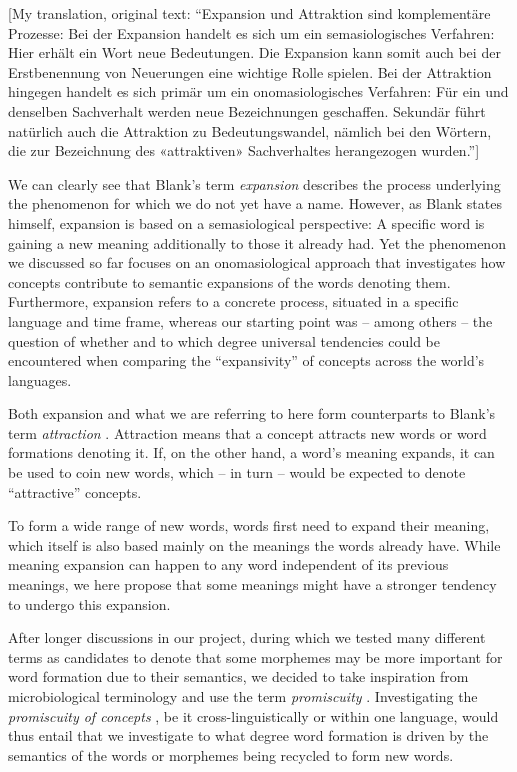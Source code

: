 \documentclass[
  english,
  a4paper,
  oneside,tablecaptionabove
]{scrbook}
\begin{document}
{{[}My translation, original text: \enquote{Expansion und Attraktion
sind komplementäre Prozesse: Bei der Expansion handelt es sich um ein
semasiologisches Verfahren: Hier erhält ein Wort neue Bedeutungen. Die
Expansion kann somit auch bei der Erstbenennung von Neuerungen eine
wichtige Rolle spielen. Bei der Attraktion hingegen handelt es sich
primär um ein onomasiologisches Verfahren: Für ein und denselben
Sachverhalt werden neue Bezeichnungen geschaffen. Sekundär führt
natürlich auch die Attraktion zu Bedeutungswandel, nämlich bei den
Wörtern, die zur Bezeichnung des «attraktiven» Sachverhaltes
herangezogen wurden.}{]}}

We can clearly see that Blank's term \emph{expansion} describes the
process underlying the phenomenon for which we do not yet have a name.
However, as Blank states himself, expansion is based on a semasiological
perspective: A specific word is gaining a new meaning additionally to
those it already had. Yet the phenomenon we discussed so far focuses on
an onomasiological approach that investigates how concepts contribute to
semantic expansions of the words denoting them. Furthermore, expansion
refers to a concrete process, situated in a specific language and time
frame, whereas our starting point was -- among others -- the question of
whether and to which degree universal tendencies could be encountered
when comparing the \enquote{expansivity} of concepts across the world's
languages.

Both expansion and what we are referring to here form counterparts to
Blank's term \emph{attraction} . Attraction means that a concept
attracts new words or word formations denoting it. If, on the other
hand, a word's meaning expands, it can be used to coin new words, which
-- in turn -- would be expected to denote \enquote{attractive} concepts.

To form a wide range of new words, words first need to expand their
meaning, which itself is also based mainly on the meanings the words
already have. While meaning expansion can happen to any word independent
of its previous meanings, we here propose that some meanings might have
a stronger tendency to undergo this expansion.

After longer discussions in our project, during which we tested many
different terms as candidates to denote that some morphemes may be more
important for word formation due to their semantics, we decided to take
inspiration from microbiological terminology and use the term
\emph{promiscuity} . Investigating the \emph{promiscuity of concepts} ,
be it cross-linguistically or within one language, would thus entail
that we investigate to what degree word formation is driven by the
semantics of the words or morphemes being recycled to form new words.
\end{document}
